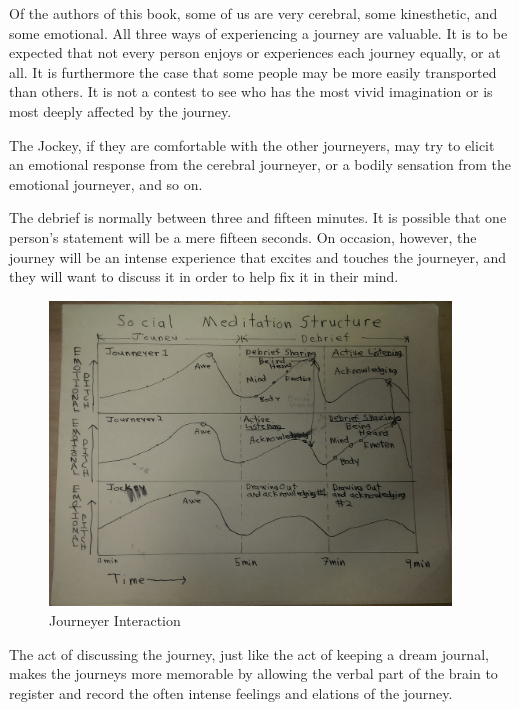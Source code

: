 \documentclass[12pt]{book}
\begin{document}
Of the authors of this book, some of us are very cerebral, some kinesthetic, and some emotional. All three ways of experiencing a journey are valuable. It is to be expected that not every person enjoys or experiences each journey equally, or at all. It is furthermore the case that some people may be more easily transported than others.
It is not a contest to see who has the most vivid imagination or is most deeply affected by the journey.
					
The Jockey, if they are comfortable with the other journeyers, may try to elicit an emotional response from the cerebral journeyer, or a bodily sensation from the emotional journeyer, and so on.
					
The debrief is normally between three and fifteen minutes. It is possible that one person’s statement will be a mere fifteen seconds. On occasion, however, the journey will be an intense experience that excites and touches the journeyer, and they will want to discuss it in order to help fix it in their mind.



\begin{figure}
  \centering
     \includegraphics[width=0.95\textwidth]{WacuriFigures/socialmeditationstructure.jpg}
     \caption{Journeyer Interaction}
  \label{fig:socialmeditation}     
\end{figure}

The act of discussing the journey, just like the act of keeping a dream journal, makes the journeys more memorable by allowing the verbal part of the brain to register and record the often intense feelings and elations of the journey.
					
\end{document}
